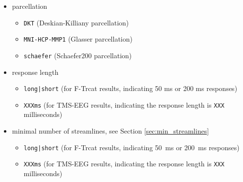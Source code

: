 \begin{itemize}
    \item parcellation
    \begin{itemize}
        \item \texttt{DKT} (Deskian-Killiany parcellation)
        \item \texttt{MNI-HCP-MMP1} (Glasser parcellation)
        \item \texttt{schaefer} (Schaefer200 parcellation)
    \end{itemize}
    \item response length
    \begin{itemize}
        \item \texttt{long|short} (for F-Trcat results, indicating 50 ms or 200 ms responses)
        \item \texttt{XXXms} (for TMS-EEG results, indicating the response length is \texttt{XXX} milliseconds)
    \end{itemize}
    \item minimal number of streamlines, see Section \ref{sec:min_streamlines}
    \begin{itemize}
        \item \texttt{long|short} (for F-Trcat results, indicating 50~ms or 200~ms responses)
        \item \texttt{XXXms} (for TMS-EEG results, indicating the response length is \texttt{XXX} milliseconds)
    \end{itemize}
\end{itemize}